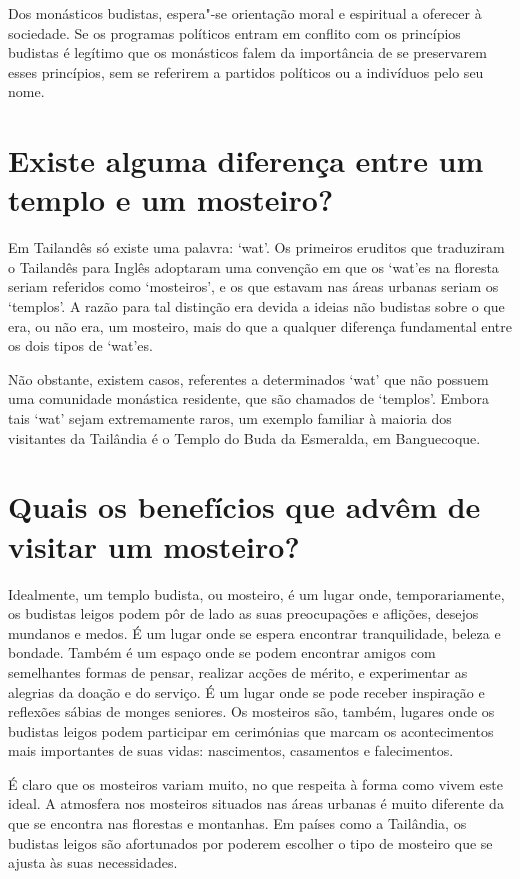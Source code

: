 Dos monásticos budistas, espera"-se orientação moral e espiritual a
oferecer à sociedade. Se os programas políticos entram em conflito com
os princípios budistas é legítimo que os monásticos falem da importância
de se preservarem esses princípios, sem se referirem a partidos
políticos ou a indivíduos pelo seu nome.

\section{Existe alguma diferença entre um templo e um mosteiro?}

Em Tailandês só existe uma palavra: `wat'. Os primeiros eruditos que
traduziram o Tailandês para Inglês adoptaram uma convenção em que os
`wat'es na floresta seriam referidos como `mosteiros', e os que
estavam nas áreas urbanas seriam os `templos'. A razão para tal
distinção era devida a ideias não budistas sobre o que era, ou não era,
um mosteiro, mais do que a qualquer diferença fundamental entre os dois
tipos de `wat'es.

Não obstante, existem casos, referentes a determinados `wat' que não
possuem uma comunidade monástica residente, que são chamados de
`templos'. Embora tais `wat' sejam extremamente raros, um exemplo
familiar à maioria dos visitantes da Tailândia é o Templo do Buda da
Esmeralda, em Banguecoque.

\section{Quais os benefícios que advêm de visitar um mosteiro?}

Idealmente, um templo budista, ou mosteiro, é um lugar onde,
temporariamente, os budistas leigos podem pôr de lado as suas
preocupações e aflições, desejos mundanos e medos. É um lugar onde se
espera encontrar tranquilidade, beleza e bondade. Também é um espaço
onde se podem encontrar amigos com semelhantes formas de pensar,
realizar acções de mérito, e experimentar as alegrias da doação e do
serviço. É um lugar onde se pode receber inspiração e reflexões sábias
de monges seniores. Os mosteiros são, também, lugares onde os budistas
leigos podem participar em cerimónias que marcam os acontecimentos mais
importantes de suas vidas: nascimentos, casamentos e falecimentos.

É claro que os mosteiros variam muito, no que respeita à forma como
vivem este ideal. A atmosfera nos mosteiros situados nas áreas urbanas é
muito diferente da que se encontra nas florestas e montanhas. Em países
como a Tailândia, os budistas leigos são afortunados por poderem
escolher o tipo de mosteiro que se ajusta às suas necessidades.

